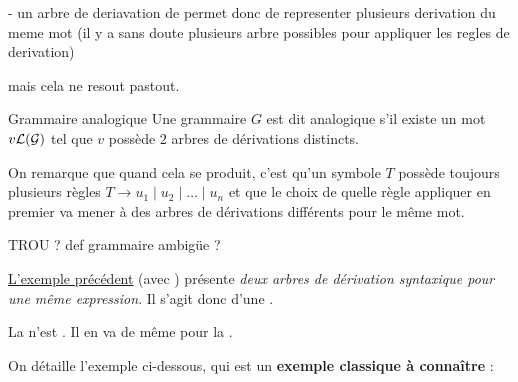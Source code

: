     \qquad    - un arbre de deriavation de permet donc de representer plusieurs derivation du meme mot (il y a sans doute plusieurs arbre possibles pour appliquer les regles de derivation)
    
    mais cela ne resout pastout.
    
    \begin{definition}{Grammaire analogique}{}
        Une grammaire $G$ est dit analogique s'il existe un mot $v \mathcal{L}\!\left(\mathcal{G}\right)$ tel que $v$ possède $2$ arbres de dérivations distincts.
    \end{definition}

    On remarque que quand cela se produit, c'est qu'un symbole $T$ possède toujours plusieurs règles $T \to u_1 \mid u_2 \mid \dots \mid u_n$ et que le choix de quelle règle appliquer en premier va mener à des arbres de dérivations différents pour le même mot.
    
    TROU ? def grammaire ambigüe ?
    
    \begin{example}{}{}
        \begin{enumerate}
            \itt \hyperref[example:gramambi]{L'exemple précédent} (avec ) présente \emph{deux arbres de dérivation syntaxique pour une même expression}. Il s'agit donc d'une .
            
            \itt La  n'est . Il en va de même pour la .
        \end{enumerate}
    \end{example}
    
    On détaille l'exemple ci-dessous, qui est un \textbf{exemple
    classique à connaître} :
    
